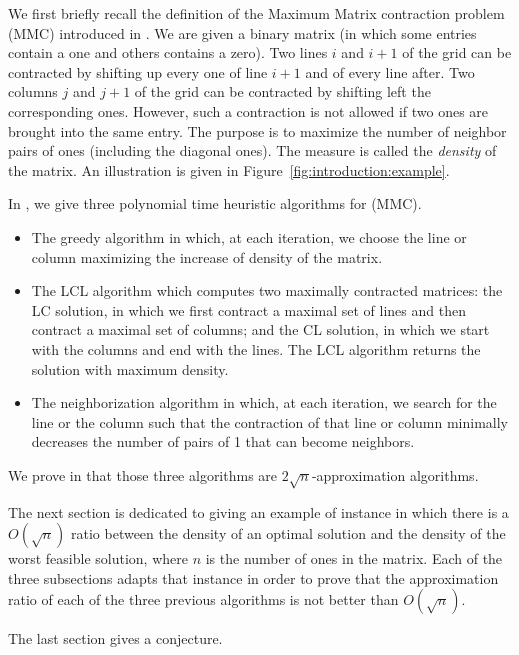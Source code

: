 We first briefly recall the definition of the Maximum Matrix contraction problem (MMC) introduced in \cite{WP16}. We are given a binary matrix (in which some entries contain a one and others contains a zero). Two lines $i$ and $i+1$ of the grid can be contracted by shifting up every one of line $i+1$ and of every line after. Two columns $j$ and $j+1$ of the grid can be contracted by shifting left the corresponding ones. However, such a contraction is not allowed if two ones are brought into the same entry. The purpose is to maximize the number of neighbor pairs of ones (including the diagonal ones). The measure is called the \emph{density} of the matrix. An illustration is given in Figure~\ref{fig:introduction:example}. 



In \cite{WP16}, we give three polynomial time heuristic algorithms for (MMC).
\begin{itemize}
	\item The greedy algorithm in which, at each iteration, we choose the line or column maximizing the increase of density of the matrix.
	\item The LCL algorithm which computes two maximally contracted matrices: the LC solution, in which we first contract a maximal set of lines and then contract a maximal set of columns; and the CL solution, in which we start with the columns and end with the lines. The LCL algorithm returns the solution with maximum density.
	\item The neighborization algorithm in which, at each iteration, we search for the line or the column such that the contraction of that line or column minimally decreases the number of pairs of 1 that can become neighbors. 
\end{itemize}
We prove in \cite{WP16} that those three algorithms are $2\sqrt{n}$-approximation algorithms.

The next section is dedicated to giving an example of instance in which there is a $O(\sqrt{n})$ ratio between the density of an optimal solution and the density of the worst feasible solution, where $n$ is the number of ones in the matrix. Each of the three subsections adapts that instance in order to prove that the approximation ratio of each of the three previous algorithms is not better than $O(\sqrt{n})$.

The last section gives a conjecture. 